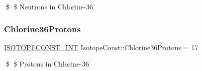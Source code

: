 \$ \$ Neutrons in Chlorine-\/36. \mbox{\label{group___isotope_const-_chlorine-_cl36_ga8a2187cb30de430d0941917b321285d7}} 
\subsubsection{\texorpdfstring{Chlorine36\+Protons}{Chlorine36Protons}}
{\footnotesize\ttfamily \mbox{\hyperlink{group___isotope_const-_macros_ga5f18360b3e99483a35c32d789e62621c}{I\+S\+O\+T\+O\+P\+E\+C\+O\+N\+S\+T\+\_\+\+I\+NT}} Isotope\+Const\+::\+Chlorine36\+Protons = 17}

\$ \$ Protons in Chlorine-\/36. 